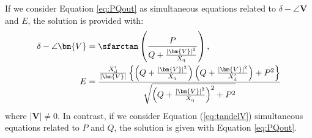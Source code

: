 \documentclass[tombow,dvipdfmx]{corona-a5-1.1}
\begin{document}
\begin{補題}\label{lem:delVE}
If we consider Equation \ref{eq:PQout} as simultaneous equations related to $\delta - \angle \bm{V}$ and $E$, the solution is provided with:\begin{subequations}\label{eq:tandelV}
\begin{align}
\delta - \angle \bm{V} & = \sfarctan  \left( \frac{P}{Q + \tfrac{ |\bm{V}|^2}{X_{\rm q}} } \right) , \label{eq:tandelVa} \\
E &=
\frac{ \tfrac{X_{\rm d}'}{|\bm{V}| } \left\{ \left( Q + \tfrac{|\bm{V}|^2}{X_{\rm q}} \right) \left(Q + \tfrac{|\bm{V}|^2}{X_{\rm d}'} \right) +P^2  \right\} }
{  \sqrt{ \left( Q + \tfrac{|\bm{V}|^2}{X_{\rm q}} \right)^2 + P^2 }  }
\label{eq:tandelVb}
\end{align}
\end{subequations}
where $|\bm{V}|\neq 0$. In contrast, if we consider Equation (\ref{eq:tandelV}) simultaneous equations related to $P$ and $Q$, the solution is given with Equation \ref{eq:PQout}.
\end{補題}
\end{document}
